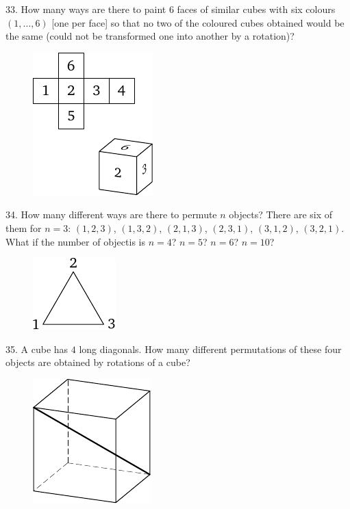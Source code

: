 \begin{problem}{33.}
	How many ways are there to paint $6$ faces of similar cubes with six colours $(1,\dotsc,6)$ [one per face]
	so that no two of the coloured cubes obtained would be the same (could not be transformed one into another
	by a rotation)?
	\begin{figure}
		\includegraphics{resources/taskbook-17}
	\end{figure}
\end{problem}

\begin{problem}{34.}
	How many different ways are there to permute $n$ objects?
	There are six of them for $n=3$: $(1,2,3)$, $(1,3,2)$, $(2,1,3)$, $(2,3,1)$, $(3,1,2)$, $(3,2,1)$. What if the number of objectis is $n=4$? $n=5$? $n=6$? $n=10$?
	\begin{figure}
		\includegraphics{resources/taskbook-18}
	\end{figure}
\end{problem}

\begin{problem}{35.}
	A cube has $4$ long diagonals. How many different permutations of these four objects are obtained by rotations of a cube?
	\begin{figure}
		\includegraphics{resources/taskbook-19}
	\end{figure}
\end{problem}

